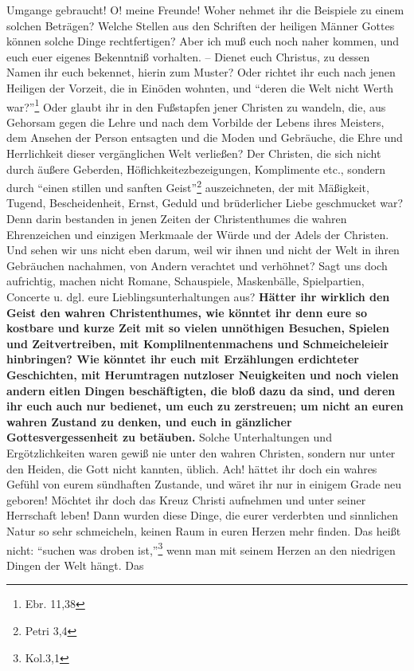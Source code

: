 Umgange gebraucht! O! meine Freunde! Woher nehmet ihr die Beispiele zu einem
solchen Beträgen? Welche Stellen aus den Schriften der heiligen Männer Gottes
können solche Dinge rechtfertigen? Aber ich muß euch noch naher kommen, und euch
euer eigenes Bekenntniß vorhalten. -- Dienet euch Christus, zu dessen Namen ihr
euch bekennet, hierin zum Muster? Oder richtet ihr euch nach jenen Heiligen der
Vorzeit, die in Einöden wohnten, und "`deren die Welt nicht Werth
war?"'\footnote{Ebr. 11,38} Oder glaubt ihr in den Fußstapfen jener Christen zu
wandeln, die, aus Gehorsam gegen die Lehre und nach dem Vorbilde der Lebens
ihres Meisters, dem Ansehen der Person entsagten und die Moden und Gebräuche,
die Ehre und Herrlichkeit dieser vergänglichen Welt verließen? Der Christen, die
sich nicht durch äußere Geberden, Höflichkeitezbezeigungen, Komplimente etc.,
sondern durch "`einen stillen und sanften Geist"'\footnote{Petri 3,4}
auszeichneten, der mit Mäßigkeit, Tugend, Bescheidenheit, Ernst, Geduld und
brüderlicher Liebe geschmucket war? Denn darin bestanden in jenen Zeiten der
Christenthumes die wahren Ehrenzeichen und einzigen Merkmaale der Würde und der
Adels der Christen. Und sehen wir uns nicht eben darum, weil wir ihnen und nicht
der Welt in ihren Gebräuchen nachahmen, von Andern verachtet und verhöhnet? Sagt
uns doch aufrichtig, machen nicht Romane, Schauspiele, Maskenbälle,
Spielpartien, Concerte u. dgl. eure Lieblingsunterhaltungen aus? \textbf{Hätter ihr
wirklich den Geist den wahren Christenthumes, wie könntet ihr denn eure so
kostbare und kurze Zeit mit so vielen unnöthigen Besuchen, Spielen und
Zeitvertreiben, mit Komplilnentenmachens und Schmeicheleieir hinbringen? Wie
könntet ihr euch mit Erzählungen erdichteter Geschichten, mit Herumtragen
nutzloser Neuigkeiten und noch vielen andern eitlen Dingen beschäftigten, die
bloß dazu da sind, und deren ihr euch auch nur bedienet, um euch zu zerstreuen;
um nicht an euren wahren Zustand zu denken, und euch in gänzlicher
Gottesvergessenheit zu betäuben.} Solche Unterhaltungen und Ergötzlichkeiten
waren gewiß nie unter den wahren Christen, sondern nur unter den Heiden, die
Gott nicht kannten, üblich. Ach! hättet ihr doch ein wahres Gefühl von eurem
sündhaften Zustande, und wäret ihr nur in einigem Grade neu geboren! Möchtet ihr
doch das Kreuz Christi aufnehmen und unter seiner Herrschaft leben! Dann wurden
diese Dinge, die eurer verderbten und sinnlichen Natur so sehr schmeicheln,
keinen Raum in euren Herzen mehr finden. Das heißt nicht: "`suchen was droben
ist,"'\footnote{Kol.3,1}  wenn man mit seinem Herzen an den niedrigen Dingen der Welt hängt. Das
